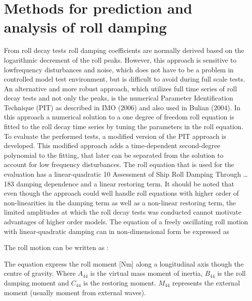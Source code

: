 \section{Methods for prediction and analysis of roll damping}
\label{se:methods_for_prediction_and_analysis}
From roll decay tests roll damping coefficients are normally derived based on the
logarithmic decrement of the roll peaks. However, this approach is sensitive to lowfrequency disturbances and noise, which does not have to be a problem in controlled
model test environment, but is difficult to avoid during full scale tests. An alternative
and more robust approach, which utilizes full time series of roll decay tests and
not only the peaks, is the numerical Parameter Identification Technique (PIT) as
described in IMO (2006) and also used in Bulian (2004). In this approach a numerical
solution to a one degree of freedom roll equation is fitted to the roll decay time series
by tuning the parameters in the roll equation.
To evaluate the performed tests, a modified version of the PIT approach is developed. This modified approach adds a time-dependent second-degree polynomial to
the fitting, that later can be separated from the solution to account for low frequency
disturbances. The roll equation that is used for the evaluation has a linear-quadratic
10 Assessment of Ship Roll Damping Through … 183
damping dependence and a linear restoring term. It should be noted that even though
the approach could well handle roll equations with higher order of non-linearities in
the damping term as well as a non-linear restoring term, the limited amplitudes at
which the roll decay tests was conducted cannot motivate advantages of higher order
models.
The equation of a freely oscillating roll motion with linear-quadratic damping can
in non-dimensional form be expressed as

The roll motion can be written as \cite{himeno_prediction_1981}:


The equation express the roll moment [Nm] along a longitudinal axis though the centre of gravity.
Where $A_{44}$ is the virtual mass moment of inertia, $B_{44}$ is the roll damping moment and $C_{44}$ is the restoring moment. $M_{44}$ represents the external moment (usually moment from external waves).



